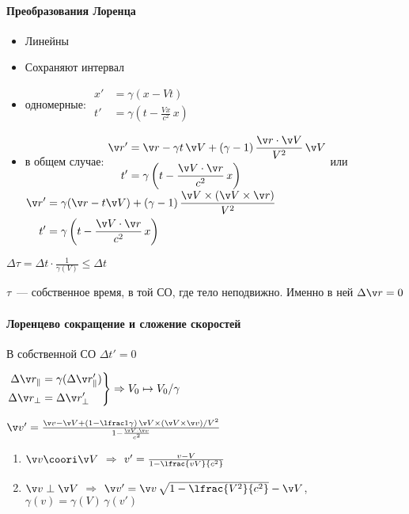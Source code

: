 \documentclass[draft]{trchesh}
\begin{document}
\begin{multicols*}{3}
\paragraph{Преобразования Лоренца}
\begin{itemize}
  \item Линейны
  \item Сохраняют интервал
\end{itemize}

\begin{itemize}
  \item одномерные: $
    \begin{aligned}
      x' &= \gamma(x -Vt) \\
      t' &= \gamma(t - \frac{Vx}{c^2} \, x)
    \end{aligned}
    $
  \item в общем случае: $
    \begin{aligned}
      \v r' &= \v r - \gamma t \, \v V + (\gamma-1) \, \frac{\v r\cdot \v V}{V^2}\, \v V \\
      t' &= \gamma\left(t - \frac{\v V\cdot \v r}{c^2} \, x\right)
    \end{aligned}
    $ или
    $\begin{aligned}
      \v r' &= \gamma (\v r -  t \v V) + (\gamma-1) \, \frac{\v V \times (\v V \times \v r)}{V^2} \\
      t' &= \gamma\left(t - \frac{\v V\cdot \v r}{c^2} \, x\right)
    \end{aligned}$
\end{itemize}
$\Delta \tau = \Delta t \cdot \frac {1}{\gamma(V)} \leqslant \Delta t$

$\tau$~--- собственное время, в той СО, где тело неподвижно. Именно в ней $\Delta \v r = 0$
\paragraph{Лоренцево сокращение и сложение скоростей}
В собственной СО $\Delta t' = 0$
\par\vspace{1ex}
$\left.\begin{aligned}
    \Delta \v r_\parallel &= \gamma (\Delta \v r'_\parallel) \\
    \Delta \v r_\perp &= \Delta \v r'_\perp
\end{aligned}\right\}\Rightarrow V_0 \mapsto V_0/\gamma $ 
\par\vspace{1em}
$\v v' = \frac{\v v - \v V + (1-\lfrac 1 \gamma) \, \v V \times (\v V \times \v v)/V^2}
{1-\frac{\v V\cdot\v v}{c^2}}$
\begin{enumerate}
  \item $\v v \coori \v V$ $ \Rightarrow$ $v' = \frac{v - V}{1 -\lfrac{vV}{c^2}}$
  \item $\v v \perp \v V$ $ \Rightarrow$ $\v v' = \v v\, \sqrt{1-\lfrac{V^2}{c^2}} - \v V$,
    $\gamma(v) = \gamma(V)\, \gamma (v')$
\end{enumerate}


\end{multicols*}
\end{document}
